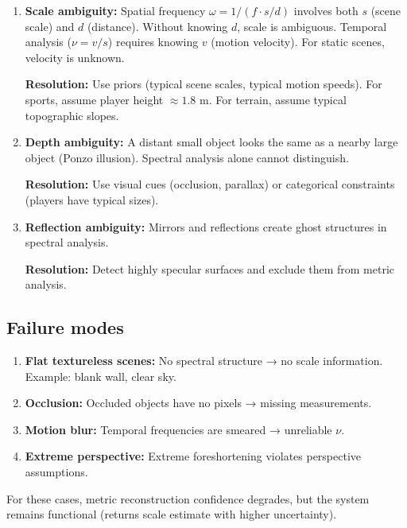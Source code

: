\documentclass[11pt,twocolumn,a4paper]{article}
\theoremstyle{definition}
\begin{document}
\begin{enumerate}[leftmargin=1.4em]
  \item \textbf{Scale ambiguity:} Spatial frequency $\omega = 1/(f \cdot s/d)$ involves both $s$ (scene scale) and $d$ (distance). Without knowing $d$, scale is ambiguous. Temporal analysis ($\nu = v/s$) requires knowing $v$ (motion velocity). For static scenes, velocity is unknown.

  \textbf{Resolution:} Use priors (typical scene scales, typical motion speeds). For sports, assume player height $\approx 1.8$ m. For terrain, assume typical topographic slopes.

  \item \textbf{Depth ambiguity:} A distant small object looks the same as a nearby large object (Ponzo illusion). Spectral analysis alone cannot distinguish.

  \textbf{Resolution:} Use visual cues (occlusion, parallax) or categorical constraints (players have typical sizes).

  \item \textbf{Reflection ambiguity:} Mirrors and reflections create ghost structures in spectral analysis.

  \textbf{Resolution:} Detect highly specular surfaces and exclude them from metric analysis.
\end{enumerate}

\subsection{Failure modes}

\begin{enumerate}[leftmargin=1.4em]
  \item \textbf{Flat textureless scenes:} No spectral structure → no scale information. Example: blank wall, clear sky.
  \item \textbf{Occlusion:} Occluded objects have no pixels → missing measurements.
  \item \textbf{Motion blur:} Temporal frequencies are smeared → unreliable $\nu$.
  \item \textbf{Extreme perspective:} Extreme foreshortening violates perspective assumptions.
\end{enumerate}

For these cases, metric reconstruction confidence degrades, but the system remains functional (returns scale estimate with higher uncertainty).

\end{document}
